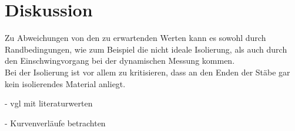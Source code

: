 \section{Diskussion}
\label{sec:Diskussion}

Zu Abweichungen von den zu erwartenden Werten kann es sowohl durch Randbedingungen, wie zum 
Beispiel die nicht ideale Isolierung, als auch durch den Einschwingvorgang bei der 
dynamischen Messung kommen. \\
Bei der Isolierung ist vor allem zu kritisieren, dass an den Enden der Stäbe gar kein 
isolierendes Material anliegt.

- vgl mit literaturwerten

- Kurvenverläufe betrachten

